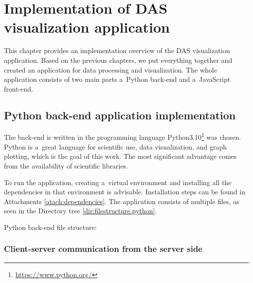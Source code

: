 \chapter{Implementation of DAS visualization application}\label{txt.implementation}

This chapter provides an implementation overview of the DAS visualization application. Based on the previous chapters, we put everything together and created an application for data processing and visualization. The whole application consists of two main parts a~Python back-end and a~JavaScript front-end. 

\section{Python back-end application implementation}\label{txt.implementation.python}

The back-end is written in the programming language Python3.10\footnote{\url{https://www.python.org/}} was chosen. Python is a~great language for scientific use, data visualization, and graph plotting, which is the goal of this work. The most significant advantage comes from the availability of scientific libraries. 

To run the application, creating a~virtual environment and installing all the dependencies in that environment is advisable. Installation steps can be found in Attachments \ref{atach:dependencies}. The application consists of multiple files, as seen in the Directory tree \ref{dir:filestructure.python}. 

\bigskip
Python back-end file structure:

{\small
%
\label{dir:filestructure.python}
}
\bigskip

\subsection{Client-server communication from the server side}

